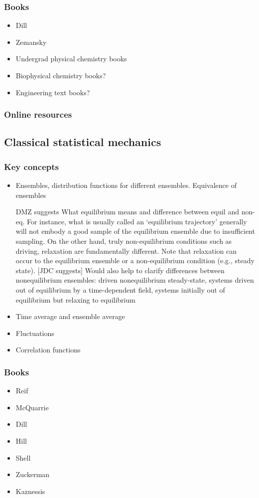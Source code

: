 \documentclass[9pt,bestpractices]{livecoms}
\begin{document}
\subsubsection{Books}
\begin{itemize}
\item Dill
\item Zemansky
\item Undergrad physical chemistry books
\item Biophysical chemistry books?
\item Engineering text books?
\end{itemize}
\subsubsection{Online resources}

\subsection{Classical statistical mechanics}
\subsubsection{Key concepts}
\begin{itemize}
\item Ensembles, distribution functions for different ensembles. Equivalence of ensembles
\item [DMZ suggests] What equilibrium means and difference between equil and non-eq.  For instance, what is usually called an ‘equilibrium trajectory’ generally will not embody a good sample of the equilibrium ensemble due to insufficient sampling.  On the other hand, truly non-equilibrium conditions such as driving, relaxation are fundamentally different.  Note that relaxation can occur to the equilibrium ensemble or a non-equilibrium condition (e.g., steady state).  [JDC suggests] Would also help to clarify differences between nonequilibrium ensembles: driven nonequilibrium steady-state, systems driven out of equilibrium by a time-dependent field, systems initially out of equilibrium but relaxing to equilibrium
\item Time average and ensemble average
\item Fluctuations
\item Correlation functions
\end{itemize}
\subsubsection{Books}
\begin{itemize}
\item Reif
\item McQuarrie
\item Dill
\item Hill
\item Shell
\item Zuckerman
\item Kaznessis
\end{itemize}
\end{document}
